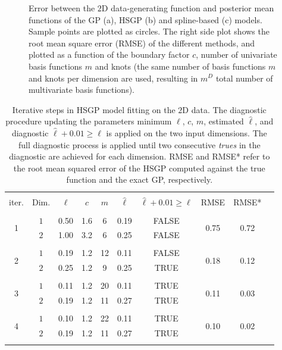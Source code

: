 \begin{figure}[h]
\caption{Error between the $2$D data-generating function and posterior mean functions of the GP (a), HSGP (b) and spline-based (c) models. Sample points are plotted as circles. The right side plot shows the root mean square error (RMSE) of the different methods, and plotted as a function of the boundary factor $c$, number of univariate basis functions $m$ and knots (the same number of basis functions $m$ and knots per dimension are used, resulting in $m^D$ total number of multivariate basis functions).}
  \label{ch5_fig16_errors_exII}
\end{figure}

\begin{table}
\centering
\setlength{\tabcolsep}{3.6pt}
\begin{tabular}{cccccccccc}
\arrayrulecolor{gray}\hline \\[-3mm]
 iter. & Dim. & $\ell$ & $c$ & $m$ & $\hat{\ell}$ & $\hat{\ell} + 0.01 \geq \ell$ & RMSE & RMSE* \\ 
\arrayrulecolor{lightgray}\hline \\[-2mm]
 \multirow{2}{*}{ 1 } & $1$ & 0.50 & 1.6 & 6 & 0.19 & FALSE & \multirow{2}{*}{ 0.75 } & \multirow{2}{*}{ 0.72 }\\ 
 & $2$ & 1.00 & 3.2 & 6 & 0.25 & FALSE &  &  \\
\arrayrulecolor{lightgray}\hline \\[-2mm]
 \multirow{2}{*}{ 2 } & $1$ & 0.19 & 1.2 & 12 & 0.11 & FALSE  & \multirow{2}{*}{ 0.18 } & \multirow{2}{*}{ 0.12 }\\
 & $2$ & 0.25 & 1.2 & 9 & 0.25 & TRUE &  &  \\
\arrayrulecolor{lightgray}\hline \\[-2mm]
 \multirow{2}{*}{ 3 } & $1$ & 0.11 & 1.2 & 20 & 0.11 & TRUE  & \multirow{2}{*}{ 0.11 } & \multirow{2}{*}{ 0.03 }\\
 & $2$ & 0.19 & 1.2 & 11 & 0.27 & TRUE &  &  \\
\arrayrulecolor{lightgray}\hline \\[-2mm]
 \multirow{2}{*}{ 4 } & $1$ & 0.10 & 1.2 & 22 & 0.11 & TRUE  & \multirow{2}{*}{ 0.10 } & \multirow{2}{*}{ 0.02 }\\
 & $2$ & 0.19 & 1.2 & 11 & 0.27 & TRUE  &  & \\[1mm] 
\arrayrulecolor{lightgray}\hline
 \multicolumn{8}{l}{{\small Exact GP length-scales:} $\ell_{1_{GP}}=0.10$, \, $\ell_{2_{GP}}=0.29$ }
\end{tabular}
\caption{Iterative steps in HSGP model fitting on the $2$D data. The diagnostic procedure updating the parameters minimum $\ell$, $c$, $m$, estimated $\hat{\ell}$, and diagnostic $\hat{\ell} + 0.01 \geq \ell$ is applied on the two input dimensions. The full diagnostic process is applied until two consecutive \textit{trues} in the diagnostic are achieved for each dimension. RMSE and RMSE* refer to the root mean squared error of the HSGP computed against the true function and the exact GP, respectively.}
  \label{tab_caseIII_2D}
\end{table}

